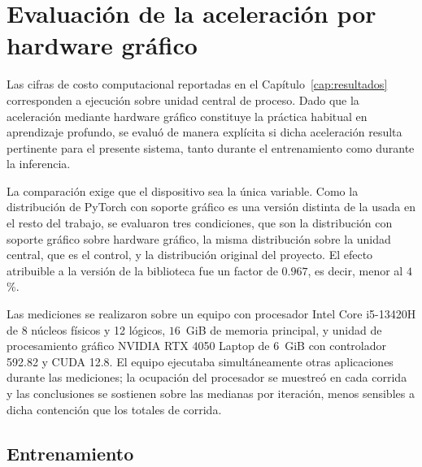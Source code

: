 
\section{Evaluación de la aceleración por hardware gráfico}
\label{anx:gpu}

Las cifras de costo computacional reportadas en el Capítulo~\ref{cap:resultados} corresponden a ejecución sobre unidad central de proceso. Dado que la aceleración mediante hardware gráfico
constituye la práctica habitual en aprendizaje profundo, se evaluó de manera
explícita si dicha aceleración resulta pertinente para el presente sistema,
tanto durante el entrenamiento como durante la inferencia.

La comparación exige que el dispositivo sea la única variable. Como la distribución de PyTorch con soporte gráfico es una versión distinta de la usada en el resto del trabajo, se evaluaron tres condiciones, que son la distribución con soporte gráfico sobre hardware gráfico, la misma distribución sobre la unidad central, que es el control, y la distribución original del proyecto. El efecto atribuible a la versión de la biblioteca fue un factor de $0{.}967$, es decir, menor al $4$\,\%.

Las mediciones se realizaron sobre un equipo con procesador Intel Core
i5-13420H de 8 núcleos físicos y 12 lógicos, $16$~GiB de memoria
principal, y unidad de procesamiento gráfico NVIDIA RTX 4050 Laptop de $6$~GiB
con controlador 592.82 y CUDA 12.8. El equipo ejecutaba
simultáneamente otras aplicaciones durante las mediciones; la ocupación del
procesador se muestreó en cada corrida y las conclusiones se sostienen sobre
las medianas por iteración, menos sensibles a dicha contención que los totales
de corrida.

\subsection*{Entrenamiento}

